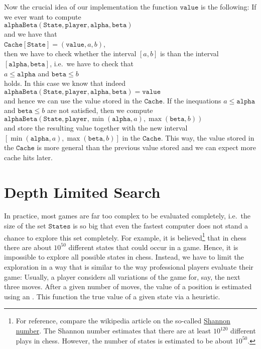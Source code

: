Now the crucial idea of our implementation the function $\mathtt{value}$ is the following:  If we ever want to
compute 
\\[0.2cm]
\hspace*{1.3cm}
$\mathtt{alphaBeta}(\mathtt{State}, \mathtt{player}, \mathtt{alpha}, \mathtt{beta})$
\\[0.2cm]
and we have that 
\\[0.2cm]
\hspace*{1.3cm}
$\mathtt{Cache}[\mathtt{State}] = (\mathtt{value}, a, b)$,
\\[0.2cm]
then we have to check whether the interval $[a,b]$ is  than the
interval $[\mathtt{alpha}, \mathtt{beta}]$, i.e.~we have to check that
\\[0.2cm]
\hspace*{1.3cm}
$a \leq \mathtt{alpha}$ \quad and \quad $\mathtt{beta} \leq b$ 
\\[0.2cm]
holds.  In this case we know that indeed
\\[0.2cm]
\hspace*{1.3cm}
$\mathtt{alphaBeta}(\mathtt{State}, \mathtt{player}, \mathtt{alpha}, \mathtt{beta}) = \mathtt{value}$
\\[0.2cm]
and hence we can use the value stored in the $\mathtt{Cache}$.  If the inequations $a \leq \mathtt{alpha}$ and
$\mathtt{beta} \leq b$  are not satisfied, then we compute
\\[0.2cm]
\hspace*{1.3cm}
$\mathtt{alphaBeta}(\mathtt{State}, \mathtt{player}, \min(\mathtt{alpha}, a), \max(\mathtt{beta}, b))$
\\[0.2cm]
and store the resulting value together with the new interval $[\min(\mathtt{alpha}, a), \max(\mathtt{beta},
b)]$ in the $\mathtt{Cache}$. 
This way, the value stored in the $\mathtt{Cache}$ is more general than the previous value stored and we can
expect more cache hits later.

\section{Depth Limited Search}
In practice, most games are far too complex to be evaluated completely, i.e.~the size of the set
$\texttt{States}$ is so big that even the fastest computer does not stand a chance to explore this set
completely.  For example, it is believed\footnote{
  For reference, compare the wikipedia article on the so-called
  \href{https://en.wikipedia.org/wiki/Shannon_number}{Shannon number}.
  The Shannon number estimates that there are at least $10^{120}$ different plays in chess.  However, the
  number of states is estimated to be about $10^{50}$. 
}
that in chess there are about $10^{50}$ different states that could occur in a game.
Hence, it is impossible to explore all possible states in chess.  Instead, we have to limit
the exploration in a way that is similar to the way professional players evaluate their game:  Usually, a
player considers all variations of the game for, say, the next three moves.  After a given number of moves, the
value of a position is estimated using an .  This function  the true
value of a given state via a heuristic.

